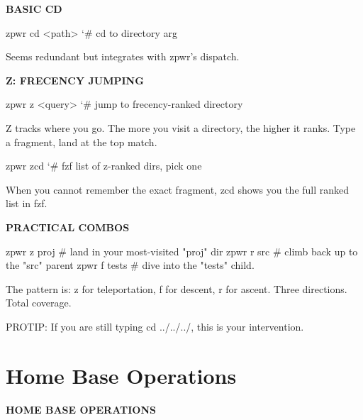 \documentclass[11pt,a4paper,twoside]{book}
\begin{document}
\vspace{12pt}
{\bfseries\color{neonyellow} BASIC CD}\vspace{4pt}

\begin{codebox}
\color{neongreen}zpwr cd <path>      {\char`\#} cd to directory arg\\
\end{codebox}

Seems redundant but integrates with zpwr's dispatch.


\vspace{12pt}
{\bfseries\color{neonyellow} Z: FRECENCY JUMPING}\vspace{4pt}

\begin{codebox}
\color{neongreen}zpwr z <query>      {\char`\#} jump to frecency-ranked directory\\
\end{codebox}

Z tracks where you go. The more you visit a directory, the higher it ranks. Type a fragment, land at the top match.

\begin{codebox}
\color{neongreen}zpwr zcd            {\char`\#} fzf list of z-ranked dirs, pick one\\
\end{codebox}

When you cannot remember the exact fragment, zcd shows you the full ranked list in fzf.


\vspace{12pt}
{\bfseries\color{neonyellow} PRACTICAL COMBOS}\vspace{4pt}

zpwr z proj         \# land in your most-visited "proj" dir zpwr r src          \# climb back up to the "src" parent zpwr f tests        \# dive into the "tests" child.

The pattern is: z for teleportation, f for descent, r for ascent. Three directions. Total coverage.

PROTIP: If you are still typing cd ../../../, this is your intervention.


\vspace{16pt}

\section{Home Base Operations}


\vspace{10pt}
{\large\bfseries\color{neoncyan} HOME BASE OPERATIONS}\vspace{6pt}
\end{document}
